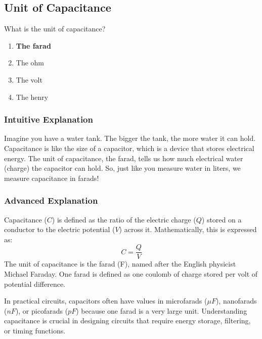 \subsection{Unit of Capacitance}
\label{T5C02}

\begin{tcolorbox}[colback=gray!10!white,colframe=black!75!black,title=T5C02]
What is the unit of capacitance?
\begin{enumerate}[label=\Alph*)]
    \item \textbf{The farad}
    \item The ohm
    \item The volt
    \item The henry
\end{enumerate}
\end{tcolorbox}

\subsubsection{Intuitive Explanation}
Imagine you have a water tank. The bigger the tank, the more water it can hold. Capacitance is like the size of a capacitor, which is a device that stores electrical energy. The unit of capacitance, the farad, tells us how much electrical water (charge) the capacitor can hold. So, just like you measure water in liters, we measure capacitance in farads!

\subsubsection{Advanced Explanation}
Capacitance (\(C\)) is defined as the ratio of the electric charge (\(Q\)) stored on a conductor to the electric potential (\(V\)) across it. Mathematically, this is expressed as:
\[
C = \frac{Q}{V}
\]
The unit of capacitance is the farad (F), named after the English physicist Michael Faraday. One farad is defined as one coulomb of charge stored per volt of potential difference. 

In practical circuits, capacitors often have values in microfarads (\(\mu F\)), nanofarads (\(nF\)), or picofarads (\(pF\)) because one farad is a very large unit. Understanding capacitance is crucial in designing circuits that require energy storage, filtering, or timing functions.

